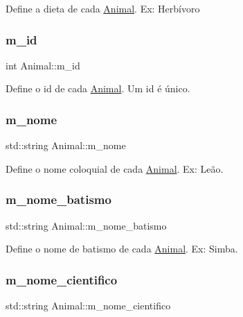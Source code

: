 Define a dieta de cada \hyperlink{classAnimal}{Animal}. Ex\+: Herbívoro \mbox{\label{classAnimal_a1a39448480e098fc74b5b67c4921a5ec}} 
\subsubsection{\texorpdfstring{m\+\_\+id}{m\_id}}
{\footnotesize\ttfamily int Animal\+::m\+\_\+id\hspace{0.3cm}{\ttfamily [protected]}}

Define o id de cada \hyperlink{classAnimal}{Animal}. Um id é único. \mbox{\label{classAnimal_adea60068908c590e8f92b2680023f8ce}} 
\subsubsection{\texorpdfstring{m\+\_\+nome}{m\_nome}}
{\footnotesize\ttfamily std\+::string Animal\+::m\+\_\+nome\hspace{0.3cm}{\ttfamily [protected]}}

Define o nome coloquial de cada \hyperlink{classAnimal}{Animal}. Ex\+: Leão. \mbox{\label{classAnimal_aa9717b7e2de07af7118050ca1c10d0b5}} 
\subsubsection{\texorpdfstring{m\+\_\+nome\+\_\+batismo}{m\_nome\_batismo}}
{\footnotesize\ttfamily std\+::string Animal\+::m\+\_\+nome\+\_\+batismo\hspace{0.3cm}{\ttfamily [protected]}}

Define o nome de batismo de cada \hyperlink{classAnimal}{Animal}. Ex\+: Simba. \mbox{\label{classAnimal_af90a04b32166b6815617cfd4033da1e4}} 
\subsubsection{\texorpdfstring{m\+\_\+nome\+\_\+cientifico}{m\_nome\_cientifico}}
{\footnotesize\ttfamily std\+::string Animal\+::m\+\_\+nome\+\_\+cientifico\hspace{0.3cm}{\ttfamily [protected]}}

